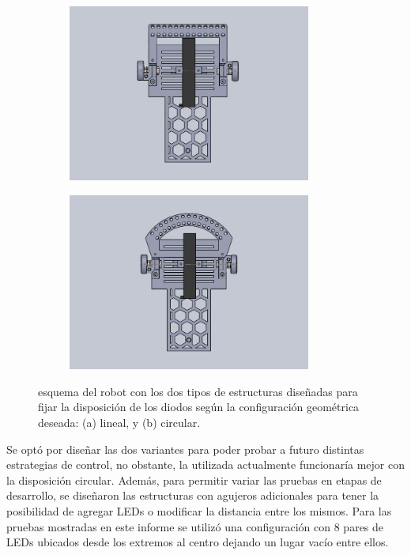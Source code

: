 \documentclass[10pt,conference,a4paper,onecolumn]{article}%
\begin{document}
\begin{figure}[h!]%
    \centering
    \begin{subfigure}[h]{0.45\textwidth}
    	\centering
        \includegraphics[width=8cm]{./imagenes/conSensorLineal.jpg}
        \caption{}
    \end{subfigure}
    \quad
    \begin{subfigure}[h]{0.45\textwidth}
    	\centering
        \includegraphics[width=8cm]{./imagenes/conSensorCircular.jpg}
        \caption{}
    \end{subfigure}
    \caption{esquema del robot con los dos tipos de estructuras diseñadas para fijar la disposición de los diodos según la configuración geométrica deseada: (a) lineal, y (b) circular.}
	\label{fig:estructuraSensor}
\end{figure}

Se optó por diseñar las dos variantes para poder probar a futuro distintas estrategias de control, no obstante, la utilizada actualmente funcionaría mejor con la disposición circular. Además, para permitir variar las pruebas en etapas de desarrollo, se diseñaron las estructuras con agujeros adicionales para tener la posibilidad de agregar LEDs o modificar la distancia entre los mismos. Para las pruebas mostradas en este informe se utilizó una configuración con 8 pares de LEDs ubicados desde los extremos al centro dejando un lugar vacío entre ellos.
\end{document}

